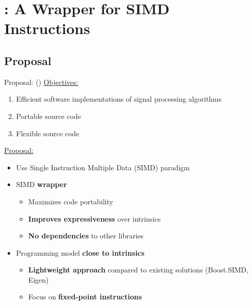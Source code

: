 
\section[MIPP]{\MIPP: A \Cxx Wrapper for SIMD Instructions}

\subsection[Proposal]{Proposal}

\begin{frame}{Proposal: \longMIPP (\MIPP)}
  \underline{Objectives:}

  \vspace{0.2cm}
  \begin{enumerate}
    \item Efficient software implementations of signal processing algorithms
    \item Portable source code
    \item Flexible source code
  \end{enumerate}
  \vspace{0.3cm}
  \pause
  \underline{Proposal:}

  \vspace{0.2cm}
  \begin{itemize}
    \item<2-> Use Single Instruction Multiple Data (SIMD) paradigm
    \item<3-> SIMD \textbf{\Cxx wrapper}
    \begin{itemize}
      \item<3-> Maximizes code portability
      \item<3-> \textbf{Improves expressiveness} over intrinsics
      \item<3-> \textbf{No dependencies} to other libraries
    \end{itemize}
    \item<4-> Programming model \textbf{close to intrinsics}
    \begin{itemize}
      \item<4-> \textbf{Lightweight approach} compared to existing solutions (Boost.SIMD, Eigen)
      \item<4-> Focus on \textbf{fixed-point instructions}
    \end{itemize}
  \end{itemize}
\end{frame}

